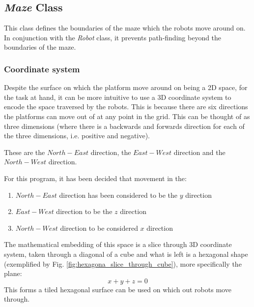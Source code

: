 \subsection{\textit{Maze} Class}



This class defines the boundaries of the maze which the robots move around on. In conjunction with the \textit{Robot} class, it prevents path-finding beyond the boundaries of the maze.

\subsubsection{Coordinate system}

Despite the surface on which the platform move around on being a 2D space, for the task at hand, it can be more intuitive to use a 3D coordinate system to encode the space traversed by the robots. This is because there are six directions the platforms can move out of  at any point in the grid. This can be thought of as three dimensions (where there is a backwards and forwards direction for each of the three dimensions, i.e. positive and negative).

These are the $North-East$ direction, the $East-West$ direction and the $North-West$ direction.

For this program, it has been decided that movement in the: 
\begin{enumerate}
\item $North-East$ direction has been considered to be the $y$ direction
\item $East-West$ direction to be the $z$ direction 
\item $North-West$ direction to be considered $x$ direction
\end{enumerate}

The mathematical embedding of this space is a slice through 3D coordinate system, taken through a diagonal of a cube and what is left is a hexagonal shape (exemplified by Fig. \ref{fig:hexagona_slice_through_cube}), more specifically the plane:
$$x + y + z = 0$$
 This forms a tiled hexagonal surface can be used on which out robots move through.

